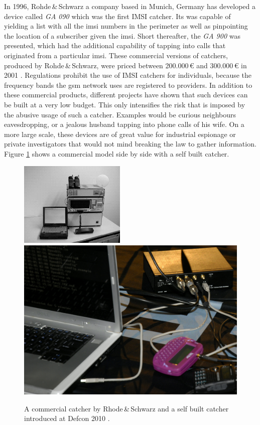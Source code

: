 In 1996, Rohde\,\&\,Schwarz a company based in Munich, Germany has developed a device called \emph{GA 090} which was the first IMSI catcher.
Its was capable of yielding a list with all the \gls{imsi} numbers in the perimeter as well as pinpointing the location of a subscriber given the \gls{imsi}.
Short thereafter, the \emph{GA 900} was presented, which had the additional capability of tapping into calls that originated from a particular \gls{imsi}.
These commercial versions of catchers, produced by Rohde\,\&\,Schwarz, were priced between 200.000\,\euro{} and 300.000\,\euro{} in 2001 \cite{fox}.
Regulations prohibit the use of IMSI catchers for individuals, because the frequency bands the \gls{gsm} network uses are registered to providers.
In addition to these commercial products, different projects \cite{dennis, def_catcher} have shown that such devices can be built at a very low budget.
This only intensifies the risk that is imposed by the abusive usage of such a catcher.
Examples would be curious neighbours eavesdropping, or a jealous husband tapping into phone calls of his wife.
On a more large scale, these devices are of great value for industrial espionage or private investigators that would not mind breaking the law to gather information.
Figure \ref{fig:catchers} shows a commercial model side by side with a self built catcher.
\begin{figure}
\centering
\includegraphics[width=0.45\textwidth]{../Images/imsi_catcher}\hspace{1cm}\includegraphics[width=.45\textwidth]{../Images/usrp}
\caption{A commercial catcher by Rhode\,\&\,Schwarz \cite{fox} and a self built catcher introduced at Defcon 2010 \cite{def_catcher}.}
\label{fig:catchers}
\end{figure}

